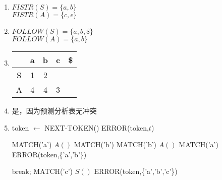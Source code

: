 \documentclass[a4paper, justified]{tufte-handout}
\begin{document}
\begin{solution}

\begin{enumerate}[(1)]
    
  \item 
  $FISTR(S) = \{a,b\}$\\
    $FISTR(A) = \{c,\epsilon\}$
  \item 
    $FOLLOW(S) = \{a,b,\$\}$\\
    $FOLLOW(A) = \{a,b\}$
  \item 
    \begin{tabular}{|c|c|c|c|c|}%
    \hline  %
    \ &a&b&c&\$\\
    \hline  %
    S&1&2&\ &\ \\
    \hline %
    A&4&4&3&\ \\
    \hline %
    \end{tabular}
  \item 
    是，因为预测分析表无冲突
  \item 
  \begin{algorithm}
    \begin{algorithmic}[1]
          \State token $\gets$ NEXT-TOKEN()
          \State ERROR(token,$t$)
        \EndIf
      \EndProcedure
    \end{algorithmic}
  \end{algorithm}
  \begin{algorithm}
    \begin{algorithmic}[1]
          \State MATCH('a')
          \State $A()$
          \State MATCH('b')
          \State MATCH('b')
          \State $A()$
          \State MATCH('a')
        \Else
          \State ERROR(token,\{'a','b'\})
        \EndIf
      \EndProcedure
    \end{algorithmic}
  \end{algorithm}
  \begin{algorithm}
    \begin{algorithmic}[1]
          \State break;
          \State MATCH('c')
          \State $S()$
        \Else
          \State ERROR(token,\{'a','b','c'\})
        \EndIf
      \EndProcedure
    \end{algorithmic}
  \end{algorithm}
\end{enumerate}

\end{solution}




\end{document}
